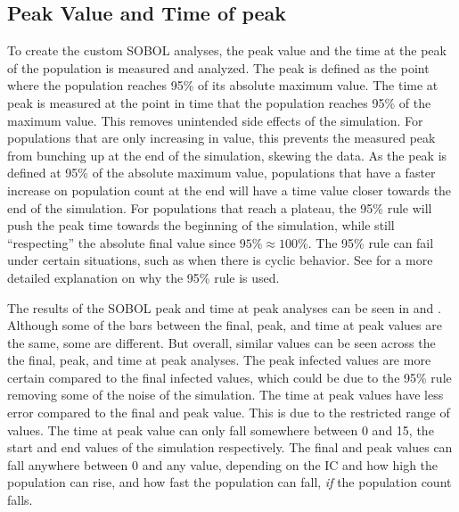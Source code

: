 \subsection{Peak Value and Time of peak}
To create the custom SOBOL analyses, the peak value and the time at the peak of the population is measured and analyzed. 
The peak is defined as the point where the population reaches 95\% of its absolute maximum value. 
The time at peak is measured at the point in time that the population reaches 95\% of the maximum value. 
This removes unintended side effects of the simulation. 
For populations that are only increasing in value, this prevents the measured peak from bunching up at the end of the simulation, skewing the data. 
As the peak is defined at 95\% of the absolute maximum value, populations that have a faster increase on population count at the end will have a time value closer towards the end of the simulation. 
For populations that reach a plateau, the 95\% rule will push the peak time towards the beginning of the simulation, while still “respecting” the absolute final value since $95\% \approx 100\%$. 
The 95\% rule can fail under certain situations, such as when there is cyclic behavior. 
See  for a more detailed explanation on why the 95\% rule is used. 


The results of the SOBOL peak and time at peak analyses can be seen in  and . 
Although some of the bars between the final, peak, and time at peak values are the same, some are different. 
But overall, similar values can be seen across the the final, peak, and time at peak analyses. 
The peak infected values are more certain compared to the final infected values, which could be due to the 95\% rule removing some of the noise of the simulation. 
The time at peak values have less error compared to the final and peak value. 
This is due to the restricted range of values. The time at peak value can only fall somewhere between 0 and 15, the start and end values of the simulation respectively. 
The final and peak values can fall anywhere between 0 and any value, depending on the IC and how high the population can rise, and how fast the population can fall, \textit{if} the population count falls. 

